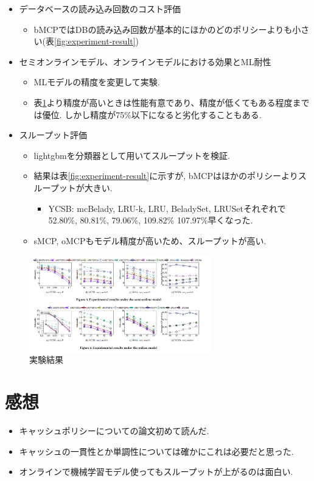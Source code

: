 \documentclass[dvipdfmx,uplatex]{jsarticle}
\theoremstyle{remark}
\newenvironment{experiment}[1]{
    \begin{tcolorbox}[
        colframe=violet,
        colback=violet!10!white,
        colbacktitle=violet!40!white,
        coltitle=black,
        fonttitle=\bfseries,
        title={#1}
    ]
}{
    \end{tcolorbox}
}
\newenvironment{kansou}{
    \begin{tcolorbox}[
        colframe=brown,
        colback=brown!10!white,
        colbacktitle=brown!40!white,
        coltitle=black,fonttitle=\bfseries
    ]
}{
    \end{tcolorbox}
}
\begin{document}
\begin{experiment}{実験結果}
\begin{itemize}
    \item データベースの読み込み回数のコスト評価
    \begin{itemize}
        \item bMCPではDBの読み込み回数が基本的にほかのどのポリシーよりも小さい(表\ref{fig:experiment-result})
    \end{itemize}
    \item セミオンラインモデル、オンラインモデルにおける効果とML耐性
    \begin{itemize}
        \item MLモデルの精度を変更して実験.
        \item 表\ref{fig:semionline-online}より精度が高いときは性能有意であり、精度が低くてもある程度までは優位. しかし精度が75\%以下になると劣化することもある.
    \end{itemize}
    \item スループット評価
    \begin{itemize}
        \item lightgbmを分類器として用いてスループットを検証.
        \item 結果は表\ref{fig:experiment-result}に示すが, bMCPはほかのポリシーよりスループットが大きい.
        \begin{itemize}
            \item YCSB: mcBelady, LRU-k, LRU, BeladySet, 
LRUSetそれぞれで52.80\%, 80.81\%, 79.06\%, 109.82\%
107.97\%早くなった.
        \end{itemize}
        \item sMCP, oMCPもモデル精度が高いため、スループットが高い.
    \end{itemize}
\end{itemize}
\end{experiment}

\begin{figure}
    \centering
    \includegraphics[width=0.7\textwidth]{img/cache-consistent/semionline-online.png}
    \caption{実験結果}
    \label{fig:semionline-online}
\end{figure}

\section{感想}
\begin{kansou}
\begin{itemize}
  \item キャッシュポリシーについての論文初めて読んだ.
  \item キャッシュの一貫性とか単調性については確かにこれは必要だと思った.
  \item オンラインで機械学習モデル使ってもスループットが上がるのは面白い.
\end{itemize}
\end{kansou}



\end{document}
